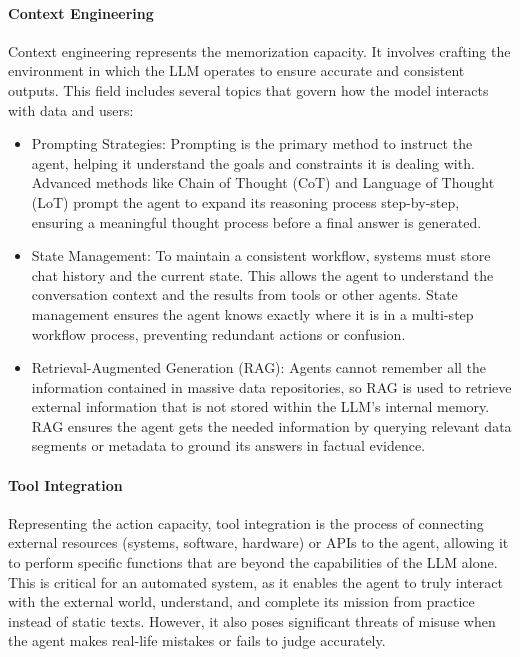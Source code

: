 \paragraph*{Context Engineering}
Context engineering represents the memorization capacity. It involves crafting the environment in which the LLM operates to ensure accurate and consistent outputs. This field includes several topics that govern how the model interacts with data and users:
\begin{itemize} 

\item {Prompting Strategies:}
Prompting is the primary method to instruct the agent, helping it understand the goals and constraints it is dealing with. Advanced methods like Chain of Thought (CoT) and Language of Thought (LoT) prompt the agent to expand its reasoning process step-by-step, ensuring a meaningful thought process before a final answer is generated.

\item {State Management:}
To maintain a consistent workflow, systems must store chat history and the current state. This allows the agent to understand the conversation context and the results from tools or other agents. State management ensures the agent knows exactly where it is in a multi-step workflow process, preventing redundant actions or confusion.

\item {Retrieval-Augmented Generation (RAG):}
Agents cannot remember all the information contained in massive data repositories, so RAG is used to retrieve external information that is not stored within the LLM's internal memory. RAG ensures the agent gets the needed information by querying relevant data segments or metadata to ground its answers in factual evidence.
\end{itemize}

\paragraph*{Tool Integration}
Representing the action capacity, tool integration is the process of connecting external resources (systems, software, hardware) or APIs to the agent, allowing it to perform specific functions that are beyond the capabilities of the LLM alone. This is critical for an automated system, as it enables the agent to truly interact with the external world, understand, and complete its mission from practice instead of static texts. However, it also poses significant threats of misuse when the agent makes real-life mistakes or fails to judge accurately.


